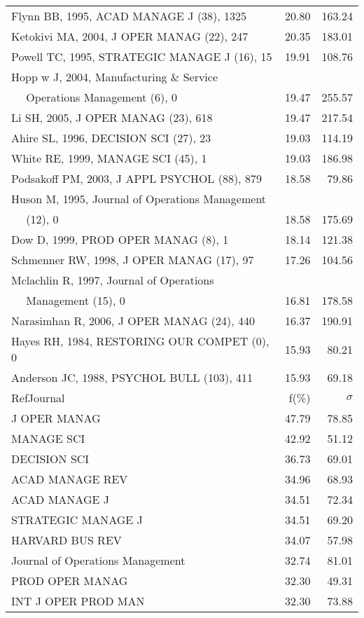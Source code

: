 \documentclass[a4paper,11pt]{report}
\begin{document}
\begin{landscape}
\begin{table}[!ht]
{\begin{tabular}{|l r r|}
Flynn BB, 1995, ACAD MANAGE J (38), 1325 & 20.80 & 163.24\\
Ketokivi MA, 2004, J OPER MANAG (22), 247 & 20.35 & 183.01\\
Powell TC, 1995, STRATEGIC MANAGE J (16), 15 & 19.91 & 108.76\\
Hopp w J, 2004, Manufacturing \& Service &  & \\
$\quad$ Operations Management (6), 0 & 19.47 & 255.57\\
Li SH, 2005, J OPER MANAG (23), 618 & 19.47 & 217.54\\
Ahire SL, 1996, DECISION SCI (27), 23 & 19.03 & 114.19\\
White RE, 1999, MANAGE SCI (45), 1 & 19.03 & 186.98\\
Podsakoff PM, 2003, J APPL PSYCHOL (88), 879 & 18.58 & 79.86\\
Huson M, 1995, Journal of Operations Management &  & \\
$\quad$ (12), 0 & 18.58 & 175.69\\
Dow D, 1999, PROD OPER MANAG (8), 1 & 18.14 & 121.38\\
Schmenner RW, 1998, J OPER MANAG (17), 97 & 17.26 & 104.56\\
Mclachlin R, 1997, Journal of Operations &  & \\
$\quad$ Management (15), 0 & 16.81 & 178.58\\
Narasimhan R, 2006, J OPER MANAG (24), 440 & 16.37 & 190.91\\
Hayes RH, 1984, RESTORING OUR COMPET (0), 0 & 15.93 & 80.21\\
Anderson JC, 1988, PSYCHOL BULL (103), 411 & 15.93 & 69.18\\
\hline
\hline
RefJournal & f(\%) & $\sigma$\\
\hline
J OPER MANAG & 47.79 & 78.85\\
MANAGE SCI & 42.92 & 51.12\\
DECISION SCI & 36.73 & 69.01\\
ACAD MANAGE REV & 34.96 & 68.93\\
ACAD MANAGE J & 34.51 & 72.34\\
STRATEGIC MANAGE J & 34.51 & 69.20\\
HARVARD BUS REV & 34.07 & 57.98\\
Journal of Operations Management & 32.74 & 81.01\\
PROD OPER MANAG & 32.30 & 49.31\\
INT J OPER PROD MAN & 32.30 & 73.88\\
\hline
\end{tabular}
}
\end{table}


\end{landscape}
\end{document}

